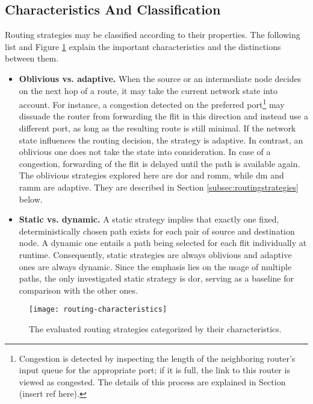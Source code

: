 \subsection{Characteristics And Classification}
Routing strategies may be classified according to their properties. The following list and Figure \ref{fig:routingcharacteristics} explain the important
characteristics and the distinctions between them.
\begin{itemize}
    \item \textbf{Oblivious vs. adaptive.} When the source or an intermediate node decides on the next hop of a route, it may take the current
        network state into account. For instance, a congestion detected on the preferred port\footnote{Congestion is detected by inspecting the length
        of the neighboring router's input queue for the appropriate port; if it is full, the link to this router is viewed as congested. The details
        of this process are explained in Section (insert ref here).} may dissuade the router from forwarding the flit in this direction and instead
        use a different port, as long as the resulting route is still minimal. If the network state influences the routing decision, the strategy is
        adaptive. In contrast, an oblivious one does not take the state into consideration. In case of a congestion, forwarding of the flit is delayed
        until the path is available again. The oblivious strategies explored here are \gls{dor} and \gls{romm}, while \gls{dm} and \gls{ramm} are
        adaptive. They are described in Section \ref{subsec:routingstrategies} below.
    \item \textbf{Static vs. dynamic.} A static strategy implies that exactly one fixed, deterministically chosen path exists for each pair of source
        and destination node. A dynamic one entails a path being selected for each flit individually at runtime. Consequently, static strategies are
        always oblivious and adaptive ones are always dynamic. Since the emphasis lies on the usage of multiple paths, the only investigated static
        strategy is \gls{dor}, serving as a baseline for comparison with the other ones.
\end{itemize}
\vspace{0.5\baselineskip}

\begin{figure}
    \centering
    \texttt{[image: routing-characteristics]}
    \caption[Routing strategies by category]{The evaluated routing strategies categorized by their characteristics.}
    \label{fig:routingcharacteristics}
\end{figure}

